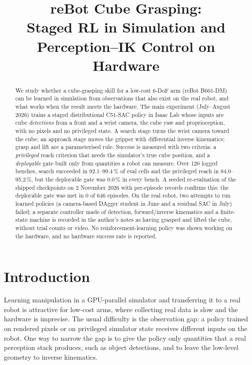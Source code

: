\documentclass[conference,10pt]{IEEEtran}
\begin{document}
\title{reBot Cube Grasping:\\Staged RL in Simulation and\\Perception--IK Control on Hardware}
\author{
}
\maketitle

\begin{abstract}
We study whether a cube-grasping skill for a low-cost 6-DoF arm (reBot B601-DM) can be learned in simulation from
observations that also exist on the real robot, and what works when the result meets the hardware. The main
experiment (July--August 2026) trains a staged distributional C51-SAC policy in Isaac Lab whose inputs are cube
\emph{detections} from a front and a wrist camera, the cube yaw and proprioception, with no pixels and no privileged
state. A search stage turns the wrist camera toward the cube; an approach stage moves the gripper with differential
inverse kinematics; grasp and lift are a parameterised rule. Success is measured with two criteria: a
\emph{privileged} reach criterion that needs the simulator's true cube position, and a \emph{deployable} gate built only
from quantities a robot can measure. Over 120 logged benches, search succeeded in 92.1--99.4\,\% of eval cells and the
privileged reach in 84.0--95.2\,\%, but the deployable gate was 0.0\,\% in every bench. A seeded re-evaluation of the
shipped checkpoints on 2 November 2026 with per-episode records confirms this: the deployable gate was met in
0 of 646 episodes. On the real robot, two attempts to run learned policies (a camera-based DAgger student in June and a
residual SAC in July) failed; a separate controller made of detection, forward/inverse kinematics and a finite-state
machine is recorded in the author's notes as having grasped and lifted the cube, without trial counts or video. No
reinforcement-learning policy was shown working on the hardware, and no hardware success rate is reported.
\end{abstract}

\section{Introduction}\label{sec:intro}
Learning manipulation in a GPU-parallel simulator and transferring it to a real robot is attractive for low-cost arms,
where collecting real data is slow and the hardware is imprecise. The usual difficulty is the observation gap: a policy
trained on rendered pixels or on privileged simulator state receives different inputs on the robot. One way to narrow
the gap is to give the policy only quantities that a real perception stack produces, such as object detections, and to
leave the low-level geometry to inverse kinematics.
\end{document}
